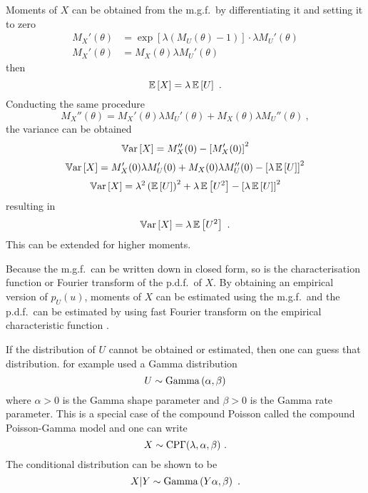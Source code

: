 Moments of $X$ can be obtained from the m.g.f.~by differentiating it and setting it to zero
\begin{align*}
	M_X'(\theta)&=\exp\left[\lambda\left(M_U(\theta)-1\right)\right]\cdot\lambda M_U'(\theta) \\
	M_X'(\theta)&=M_X(\theta)\lambda M_U'(\theta)
\end{align*}
then
\begin{equation}
	\operatorname{\mathbb{E}}\left[X\right]=\lambda\operatorname{\mathbb{E}}\left[U\right]
	\ .
\end{equation}
Conducting the same procedure
\begin{equation*}
	M_X''(\theta)=M_X'(\theta)\lambda M_U'(\theta)+M_X(\theta)\lambda M_U''(\theta)
	\ ,
\end{equation*}
the variance can be obtained
\begin{equation*}
	\operatorname{\mathbb{V}ar}\left[X\right]=M_X''(0)-\left[M_X'(0)\right]^2
\end{equation*}
\begin{equation*}
	\operatorname{\mathbb{V}ar}\left[X\right]=M_X'(0)\lambda M_U'(0)+M_X(0)\lambda M_U''(0)-\left[\lambda\operatorname{\mathbb{E}}\left[U\right]\right]^2
\end{equation*}
\begin{equation*}
	\operatorname{\mathbb{V}ar}\left[X\right]=\lambda^2 \left(\operatorname{\mathbb{E}}\left[U\right]\right)^2+\lambda \operatorname{\mathbb{E}}\left[U^2\right]-\left[\lambda\operatorname{\mathbb{E}}\left[U\right]\right]^2
\end{equation*}
resulting in
\begin{equation}
	\operatorname{\mathbb{V}ar}\left[X\right] = \lambda\operatorname{\mathbb{E}}\left[U^2\right]
	\ .
\end{equation}
This can be extended for higher moments.

Because the m.g.f.~can be written down in closed form, so is the characterisation function or Fourier transform of the p.d.f.~of $X$. By obtaining an empirical version of $p_U(u)$, moments of $X$ can be estimated using the m.g.f.~and the p.d.f.~can be estimated by using fast Fourier transform on the empirical characteristic function \citep{whiting2006properties}.

If the distribution of $U$ cannot be obtained or estimated, then one can guess that distribution. \cite{xu2009electronic} for example used a Gamma distribution
\begin{equation}
	U\sim\operatorname{Gamma}\left(\alpha,\beta\right)
\end{equation}
where $\alpha>0$ is the Gamma shape parameter and $\beta>0$ is the Gamma rate parameter. This is a special case of the compound Poisson called the compound Poisson-Gamma model and one can write
\begin{equation}
	X\sim\operatorname{CP\Gamma}(\lambda,\alpha,\beta)
	\ .
\end{equation}
The conditional distribution can be shown to be
\begin{equation}
	X|Y\sim\operatorname{Gamma}\left(Y\alpha,\beta\right)
	\ .
\end{equation}

